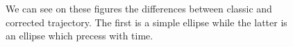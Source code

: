 \begin{figure}
	\begin{center}
	\end{center}
	\caption{We can see on these figures the differences between classic and corrected
	         trajectory. The first is a simple ellipse while the latter is an ellipse which
			 precess with time.}
	\label{flottants:precession:differences}
\end{figure}

